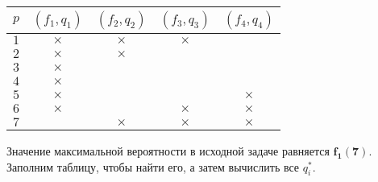 \begin{table}[H]
	\centering
	\begin{tabular}{ | c | c | c | c | c | } 
		\hline
		$p$ & $(f_1, q_1)$ & $(f_2, q_2)$ & $(f_3, q_3)$ & $(f_4, q_4)$ \\ 
		\hline
		$1$ & $\times$ & $\times$ & $\times$ & \\\hline
		$2$ & $\times$ & $\times$ & & \\\hline
		$3$ & $\times$ & & & \\\hline
		$4$ & $\times$ & & & \\\hline
		$5$ & $\times$ & & & $\times$ \\\hline
		$6$ & $\times$ & & $\times$ & $\times$ \\\hline
		$7$ & & $\times$ & $\times$ & $\times$ \\\hline
	\end{tabular}
\end{table}

Значение максимальной вероятности в исходной задаче равняется $\mathbf {f_1(7)}$. Заполним таблицу, чтобы найти его, а затем вычислить все $q^*_i$.

\bigskip

